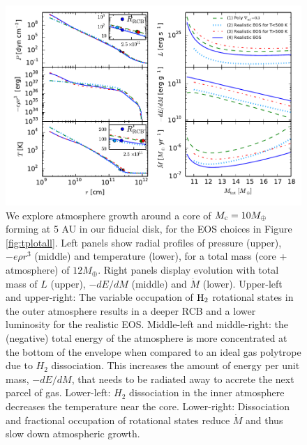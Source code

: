 \begin{figure}[tb]
\centering
\includegraphics[width=\textwidth]{figures/all_plot_test.pdf}
\caption{
We explore atmosphere growth around a core of $M_{\rm c}=10 M_{\oplus}$ forming at 5 AU in our fiducial disk, for the EOS choices in Figure \ref{fig:tplotall}. Left panels show radial profiles of pressure (upper), $-e \rho r^3$ (middle) and temperature (lower), for a total mass (core + atmosphere) of $12 M_{\oplus}$. Right panels display evolution with total mass of $L$ (upper), $-dE/dM$ (middle) and $\dot{M}$ (lower). Upper-left and upper-right: The variable occupation of $\rm H_2$ rotational states in the outer atmosphere results in a deeper RCB and a lower luminosity for the realistic EOS. Middle-left and middle-right: the (negative) total energy of the atmosphere is more concentrated at the bottom of the envelope when compared to an ideal gas polytrope due to $H_2$ dissociation. This increases the amount of energy per unit mass, $-dE/dM$, that needs to be radiated away to accrete the next parcel of gas. Lower-left: $H_2$ dissociation in the inner atmosphere decreases the temperature near the core. Lower-right: Dissociation and fractional occupation of rotational states reduce $\dot{M}$ and thus slow down atmospheric growth.}
\label{fig:all_plot}
\end{figure}

